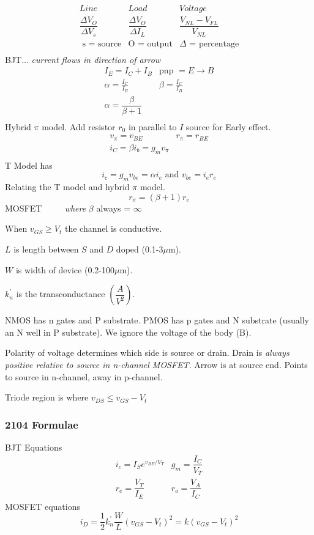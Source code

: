 \[
\begin{array}{ccc}
Line    &   Load    &   Voltage\\
\dfrac{\Delta V_O}{ \Delta V_s} &\dfrac{\Delta V_O }{\Delta I_L }&\dfrac{V_{NL}
- V_{FL}}{V_{NL}}\\

\mbox{ s = source} & \mbox{O = output}&\Delta \mbox{ = percentage}\\
\end{array}
\]
\vfill
BJT... \emph{current flows in direction of arrow}
\[ 
\begin{array}{cc}
I_E = I_C + I_B&\mbox{pnp }=  E \rightarrow B\\
\alpha = \frac{I_C}{I_E}& \beta = \frac{I_C}{I_B}\\
\alpha = \dfrac{\beta}{\beta + 1}&\\
\end{array}
\]
\vfill
Hybrid $\pi$ model. Add resistor $r_0$ in parallel to $I$ source for Early effect.
\[ 
\begin{array}{cc}
v_\pi = v_{BE}&r_\pi = r_{BE}\\
i_{C} = \beta i_b = g_m v_\pi&\\
\end{array}
\]
T Model has 
\[i_c = g_m v_{be} = \alpha i_e \mbox{ and }v_{be} = i_e r_e\]
Relating the T model and hybrid $\pi$ model.
\[ r_\pi = (\beta + 1 )r_e\]
MOSFET \ \ \ \ \emph{ where} $\beta$ always = $\infty$
\medskip

When $v_{GS} \ge V_t$ the channel is conductive. 
\smallskip

$L$ is length between $S$ and $D$ doped (0.1-3$\mu$m). 
\smallskip

$W$ is width of device (0.2-100$\mu$m).
\smallskip

$k^\prime_n$ is the transconductance $\left(\dfrac{A}{V^2}\right)$.

NMOS has n gates and P substrate. PMOS has p gates and N substrate (usually an
N well in P substrate). We ignore the voltage of the body (B).

Polarity of voltage determines which side is source or drain. Drain is
\emph{always positive relative to source in n-channel MOSFET}. Arrow is at
source end. Points to source in n-channel, away in p-channel.

Triode region is where $v_{DS} \le v_{GS} - V_t$

\subsubsection*{2104 Formulae}
BJT Equations
\[
\begin{array}{cc}
i_c = I_S e^{v_{BE}/V_T}    & g_m = \dfrac{I_C}{V_T}\\
r_e = \dfrac{V_T}{I_E}       &r_o = \dfrac{V_A}{I_C}
\end{array}
\]
MOSFET equations
\[ i_D = \frac{1}{2} k_n^\prime \frac{W}{L}(v_{GS} - V_t)^2 = k(v_{GS} -
V_t)^2\]


